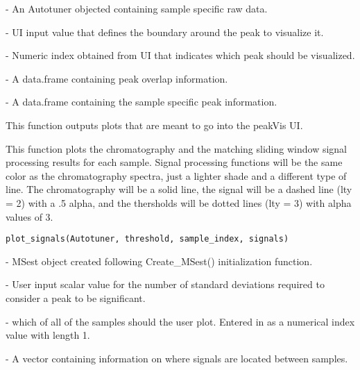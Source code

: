 \documentclass[a4paper]{book}
\begin{document}
\begin{Arguments}
\begin{ldescription}
\item[\code{Autotuner}] - An Autotuner objected containing sample specific raw
data.

\item[\code{boundary}] - UI input value that defines the boundary around the peak to
visualize it.

\item[\code{peak}] - Numeric index obtained from UI that indicates which peak
should be visualized.

\item[\code{peak\_difference}] - A data.frame containing peak overlap information.

\item[\code{peak\_table}] - A data.frame containing the sample specific peak
information.
\end{ldescription}
\end{Arguments}
%
\begin{Value}
This function outputs plots that are meant to go into the peakVis
UI.
\end{Value}
%
\begin{Description}\relax
This function plots the chromatography and the matching sliding
window signal processing results for each sample. Signal processing
functions will be the same color as the chromatography spectra, just a
lighter shade and a different type of line. The chromatography will be a
solid line, the signal will be a dashed line (lty = 2) with a .5 alpha,
and the thersholds will be dotted lines (lty = 3) with alpha values of 3.
\end{Description}
%
\begin{Usage}
\begin{verbatim}
plot_signals(Autotuner, threshold, sample_index, signals)
\end{verbatim}
\end{Usage}
%
\begin{Arguments}
\begin{ldescription}
\item[\code{Autotuner}] - MSest object created following Create\_MSest()
initialization function.

\item[\code{threshold}] - User input scalar value for the number of standard
deviations required to consider a peak to be significant.

\item[\code{sample\_index}] - which of all of the samples should the user plot.
Entered in as a numerical index value with length 1.

\item[\code{signals}] - A vector containing information on where signals are
located between samples.
\end{ldescription}
\end{Arguments}
\end{document}
